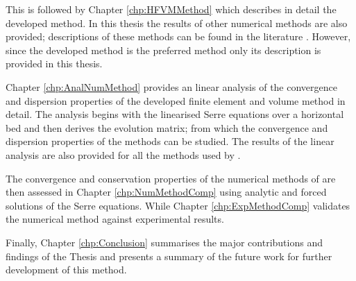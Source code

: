 This is followed by Chapter \ref{chp:HFVMMethod} which describes in detail the developed method. In this thesis the results of other numerical methods are also provided; descriptions of these methods can be found in the literature \cite{Zoppou-etal-2017,Pitt-2018-61}. However, since the developed method is the preferred method only its description is provided in this thesis. 

Chapter \ref{chp:AnalNumMethod} provides an linear analysis of the convergence and dispersion properties of the developed finite element and volume method in detail. The analysis begins with the linearised Serre equations over a horizontal bed and then derives the evolution matrix; from which the convergence and dispersion properties of the methods can be studied. The results of the linear analysis are also provided for all the methods used by \citet{Pitt-2018-61}.

The convergence and conservation properties of the numerical methods of \citet{Pitt-2018-61} are then assessed in Chapter \ref{chp:NumMethodComp} using analytic and forced solutions of the Serre equations. While Chapter \ref{chp:ExpMethodComp} validates the numerical method against experimental results.

Finally, Chapter \ref{chp:Conclusion} summarises the major contributions and findings of the Thesis and presents a summary of the future work for further development of this method. 


